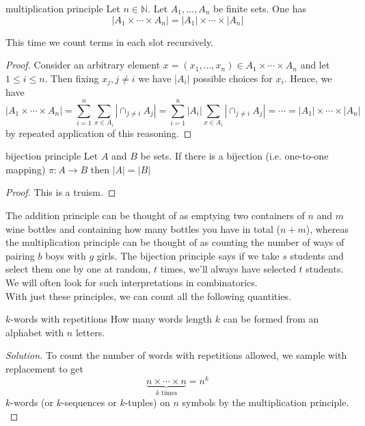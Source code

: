 \documentclass{article}
\begin{document}
\begin{theorem}[]{multiplication principle}
    Let $n \in \mathbb{N}$. Let $A_1, \dots, A_n$ be finite sets. One has
    \[|A_1 \times \cdots \times A_n| = |A_1| \times \cdots \times |A_n|\]
\end{theorem}

This time we count terms in each slot recursively.

\begin{proof}
    Consider an arbitrary element $x = (x_1, \dots, x_n) \in A_1 \times \cdots \times A_n$ and let $1 \leq i \leq n$. Then fixing $x_j, j \neq i$
    we have $|A_i|$ possible choices for $x_i$. Hence, we have 
    \[|A_1 \times \cdots \times A_n| = \sum_{i=1}^n\sum_{x \in A_i}\left|\cap_{j \neq i}A_j\right| 
    = \sum_{i=1}^n |A_i|\sum_{x \in A_i}\left|\cap_{j \neq i}A_j\right| = \cdots = |A_1| \times \cdots \times |A_n|\]
    by repeated application of this reasoning.
\end{proof}

\begin{theorem}[]{bijection principle}
    Let $A$ and $B$ be sets. If there is a bijection (i.e. one-to-one mapping) $\pi: A \to B$ then $|A| = |B|$
\end{theorem}

\begin{proof}
    This is a truism. 
\end{proof}

The addition principle can be thought of as emptying two containers of $n$ and $m$ wine bottles and containing how many bottles you have 
in total ($n+m$), whereas the multiplication principle can be thought of as counting the number of ways of pairing $b$ boys with $g$ girls. 
The bijection principle says if we take $s$ students and select them one by one at random, $t$ times, we'll always have selected $t$ students. 
We will often look for such interpretations in combinatorics. \\

With just these principles, we can count all the following quantities. 

\begin{problem}[]{$k$-words with repetitions}
    How many words length $k$ can be formed from an alphabet with $n$ letters.
\end{problem}

\begin{proof}[Solution]
    To count the number of words with repetitions allowed, we sample with replacement to get
    \[\underbrace{n \times \cdots \times n}_{k \text{ times}} = n^k\]
    $k$-words (or $k$-sequences or $k$-tuples) on $n$ symbols by the multiplication principle. \\
\end{proof}
\end{document}
